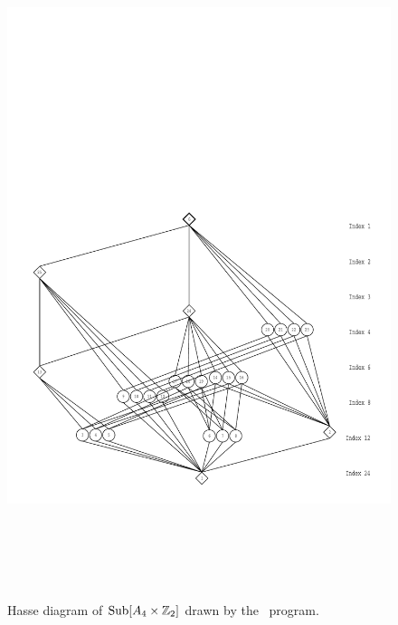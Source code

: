 \begin{enumerate}
\begin{figure}[h!]
\begin{center}
\includegraphics[height=20cm]{a4c2new.pdf}%
\caption{Hasse diagram of $\operatorname{Sub}[A_4 \times \mathbb{Z}_2]$ drawn by the \xgap\ program.}
\label{fig:a4c2}
\end{center}\end{figure}
\begin{figure}[h!]\begin{center}
\vspace{-8cm}

\end{center}
\end{figure}
\end{enumerate}
